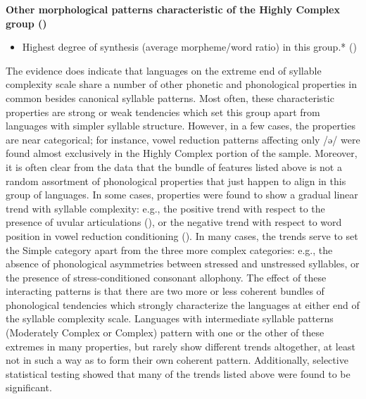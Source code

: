 \textbf{Other morphological patterns characteristic of the Highly Complex group ()}

\begin{itemize}
\item Highest degree of synthesis (average morpheme/word ratio) in this group.* {()}
\end{itemize}

  The evidence does indicate that languages on the extreme end of syllable complexity scale share a number of other phonetic and phonological properties in common besides canonical syllable patterns. Most often, these characteristic properties are strong or weak tendencies which set this group apart from languages with simpler syllable structure. However, in a few cases, the properties are near categorical; for instance, vowel reduction patterns affecting only /ə/ were found almost exclusively in the Highly Complex portion of the sample. Moreover, it is often clear from the data that the bundle of features listed above is not a random assortment of phonological properties that just happen to align in this group of languages. In some cases, properties were found to show a gradual linear trend with syllable complexity: e.g., the positive trend with respect to the presence of uvular articulations (), or the negative trend with respect to word position in vowel reduction conditioning (). In many cases, the trends serve to set the Simple category apart from the three more complex categories: e.g., the absence of phonological asymmetries between stressed and unstressed syllables, or the presence of stress-conditioned consonant allophony. The effect of these interacting patterns is that there are two more or less coherent bundles of phonological tendencies which strongly characterize the languages at either end of the syllable complexity scale. Languages with intermediate syllable patterns (Moderately Complex or Complex) pattern with one or the other of these extremes in many properties, but rarely show different trends altogether, at least not in such a way as to form their own coherent pattern. Additionally, selective statistical testing showed that many of the trends listed above were found to be significant.

